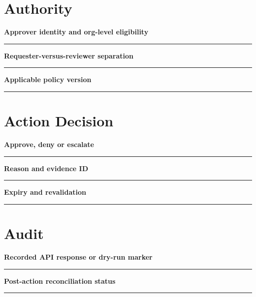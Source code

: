 \documentclass[11pt,letterpaper]{article}
\begin{document}
\section{Authority}
\noindent\textbf{Approver identity and org-level eligibility}\par
\vspace{1.1em}\noindent\rule{0.96\linewidth}{0.4pt}\par\vspace{0.65em}
\noindent\textbf{Requester-versus-reviewer separation}\par
\vspace{1.1em}\noindent\rule{0.96\linewidth}{0.4pt}\par\vspace{0.65em}
\noindent\textbf{Applicable policy version}\par
\vspace{1.1em}\noindent\rule{0.96\linewidth}{0.4pt}\par\vspace{0.65em}
\section{Action Decision}
\noindent\textbf{Approve, deny or escalate}\par
\vspace{1.1em}\noindent\rule{0.96\linewidth}{0.4pt}\par\vspace{0.65em}
\noindent\textbf{Reason and evidence ID}\par
\vspace{1.1em}\noindent\rule{0.96\linewidth}{0.4pt}\par\vspace{0.65em}
\noindent\textbf{Expiry and revalidation}\par
\vspace{1.1em}\noindent\rule{0.96\linewidth}{0.4pt}\par\vspace{0.65em}
\section{Audit}
\noindent\textbf{Recorded API response or dry-run marker}\par
\vspace{1.1em}\noindent\rule{0.96\linewidth}{0.4pt}\par\vspace{0.65em}
\noindent\textbf{Post-action reconciliation status}\par
\vspace{1.1em}\noindent\rule{0.96\linewidth}{0.4pt}\par\vspace{0.65em}
\end{document}
